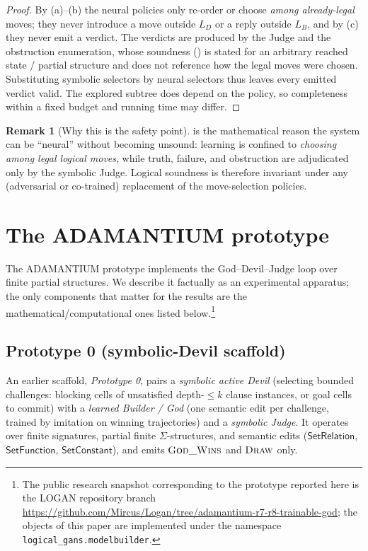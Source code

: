 \documentclass[11pt]{article}
\theoremstyle{definition}
\newtheorem{remark}{Remark}[section]
\theoremstyle{plain}
\newcommand{\Sig}{\Sigma}
\begin{document}
\begin{proof}
By (a)--(b) the neural policies only re-order or choose \emph{among already-legal} moves; they never
introduce a move outside $L_D$ or a reply outside $L_B$, and by (c) they never emit a verdict. The verdicts
are produced by the Judge and the obstruction enumeration, whose soundness () is stated for an arbitrary reached state / partial structure and does not reference how
the legal moves were chosen. Substituting symbolic selectors by neural selectors thus leaves every emitted
verdict valid. The explored subtree does depend on the policy, so completeness within a fixed budget and
running time may differ.
\end{proof}

\begin{remark}[Why this is the safety point]
 is the mathematical reason the system can be ``neural'' without becoming
unsound: learning is confined to \emph{choosing among legal logical moves}, while truth, failure, and
obstruction are adjudicated only by the symbolic Judge. Logical soundness is therefore invariant under any
(adversarial or co-trained) replacement of the move-selection policies.
\end{remark}

\section{The ADAMANTIUM prototype}
\label{sec:apparatus}

The ADAMANTIUM prototype implements the God--Devil--Judge loop over finite partial
structures. We describe it factually as an experimental apparatus; the only
components that matter for the results are the mathematical/computational ones
listed below.\footnote{The public research snapshot corresponding to the prototype
reported here is the LOGAN repository branch
\url{https://github.com/Mircus/Logan/tree/adamantium-r7-r8-trainable-god}; the objects of this
paper are implemented under the namespace \texttt{logical\_gans.modelbuilder}.}

\subsection{Prototype 0 (symbolic-Devil scaffold)}
\label{sec:proto0}

An earlier scaffold, \emph{Prototype 0}, pairs a \emph{symbolic active Devil}
(selecting bounded challenges: blocking cells of unsatisfied depth-$\le k$ clause
instances, or goal cells to commit) with a \emph{learned Builder / God} (one
semantic edit per challenge, trained by imitation on winning trajectories) and a
\emph{symbolic Judge}. It operates over finite signatures, partial finite
$\Sig$-structures, and semantic edits ($\mathsf{SetRelation}$, $\mathsf{SetFunction}$,
$\mathsf{SetConstant}$), and emits $\textsc{God\_Wins}$ and $\textsc{Draw}$ only.
\end{document}

